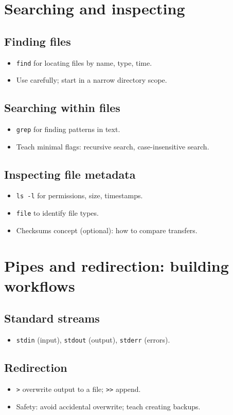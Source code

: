 \section{Searching and inspecting}
\subsection{Finding files}
\begin{itemize}
\item \texttt{find} for locating files by name, type, time.
\item Use carefully; start in a narrow directory scope.
\end{itemize}

\subsection{Searching within files}
\begin{itemize}
\item \texttt{grep} for finding patterns in text.
\item Teach minimal flags: recursive search, case-insensitive search.
\end{itemize}

\subsection{Inspecting file metadata}
\begin{itemize}
\item \texttt{ls -l} for permissions, size, timestamps.
\item \texttt{file} to identify file types.
\item Checksums concept (optional): how to compare transfers.
\end{itemize}

\section{Pipes and redirection: building workflows}
\subsection{Standard streams}
\begin{itemize}
\item \texttt{stdin} (input), \texttt{stdout} (output), \texttt{stderr} (errors).
\end{itemize}

\subsection{Redirection}
\begin{itemize}
\item \texttt{>} overwrite output to a file; \texttt{>>} append.
\item Safety: avoid accidental overwrite; teach creating backups.
\end{itemize}

